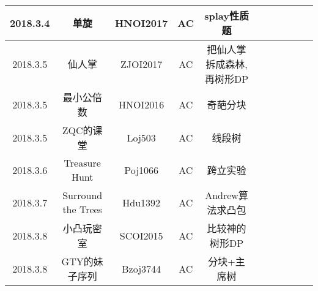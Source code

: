 \documentclass[landscape]{article}
\begin{document}
\begin{longtable}{ccccccccccc}
  \hline
  2018.3.4 & 单旋 & HNOI2017 & AC & splay性质题\\
  \hline
  2018.3.5 & 仙人掌 & ZJOI2017 & AC & 把仙人掌拆成森林,再树形DP\\
  \hline
  2018.3.5 & 最小公倍数 & HNOI2016 & AC & 奇葩分块\\
  \hline
  2018.3.5 & ZQC的课堂 & Loj503 & AC & 线段树\\
  \hline
  2018.3.6 & Treasure Hunt & Poj1066 & AC & 跨立实验\\
  \hline
  2018.3.7 & Surround the Trees & Hdu1392 & AC & Andrew算法求凸包\\
  \hline
  2018.3.8 & 小凸玩密室 & SCOI2015 & AC & 比较神的树形DP\\
  \hline
  2018.3.8 & GTY的妹子序列 & Bzoj3744 & AC & 分块+主席树\\
  \hline
  
\end{longtable}
\end{document}
